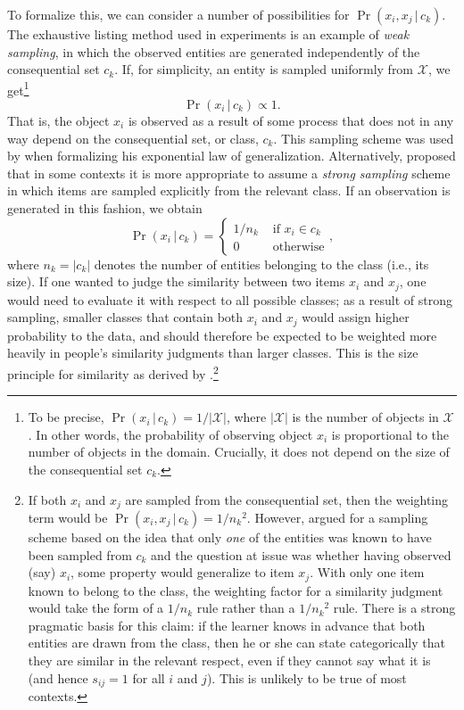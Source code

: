 \documentclass{apa}
\newcommand{\given}{\,|\,}
\begin{document}
To formalize this, we can consider a number of possibilities for $\Pr(x_i, x_j \given c_k)$. The exhaustive listing method used in experiments is an example of {\it weak sampling}, in which the observed entities are generated independently of the consequential set $c_k$. If, for simplicity, an entity is sampled uniformly from $\mathcal{X}$, we get\footnote{To be precise, $\Pr(x_i \given c_k) = 1/{|\mathcal{X}|}$, where $|\mathcal{X}|$ is the number of objects in $\mathcal{X}$. In other words, the probability of observing object $x_i$ is proportional to the number of objects in the domain.  Crucially, it does not depend on the size of the consequential set $c_k$.}
\begin{equation}
\Pr(x_i \given c_k) \propto 1.
\end{equation}
That is, the object $x_i$ is observed as a result of some process that does not in any way depend on the consequential set, or class, $c_k$. This sampling scheme was used by  when formalizing his exponential law of generalization.  Alternatively,  proposed that in some contexts it is more appropriate to assume a {\it strong sampling} scheme in which items are sampled explicitly from the relevant class. If an observation is generated in this fashion, we obtain
\begin{equation}
\Pr(x_i\given c_k) = \left\{ \begin{array}{cl} 1/{n_k} & \mbox{ if } x_i \in c_k \\ 0 & \mbox{ otherwise} \end{array} \right.,
\end{equation}
\noindent
where $n_k = |c_k|$ denotes the number of entities belonging to the class (i.e., its size). If one wanted to judge the similarity between two items $x_i$ and $x_j$, one would need to evaluate it with respect to all possible classes; as a result of strong sampling, smaller classes that contain both $x_i$ and $x_j$ would assign higher probability to the data, and should therefore be expected to be weighted more heavily in people's similarity judgments than larger classes. This is the size principle for similarity as derived by .\footnote{If both $x_i$ and $x_j$ are sampled from the consequential set, then the weighting term would be $\Pr(x_i, x_j \given c_k) = 1/{n_k}^2$. However,  argued for a sampling scheme based on the idea that only {\it one} of the entities was known to have been sampled from $c_k$ and the question at issue was whether having observed (say) $x_i$, some property would generalize to item $x_j$. With only one item known to belong to the class, the weighting factor for a similarity judgment would take the form of a $1/n_k$ rule rather than a $1/{n_k}^2$ rule. There is a strong pragmatic basis for this claim: if the learner knows in advance that both entities are drawn from the class, then he or she can state categorically that they are similar in the relevant respect, even if they cannot say what it is (and hence $s_{ij}=1$ for all $i$ and $j$). This is unlikely to be true of most contexts.}
\end{document}
